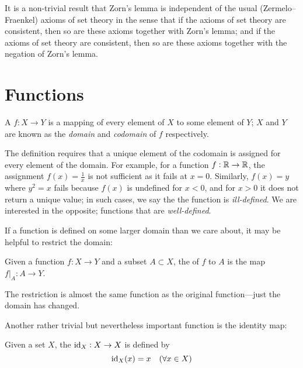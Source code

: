 \begin{remark}
It is a non-trivial result that Zorn's lemma is independent of the usual (Zermelo--Fraenkel) axioms of set theory in the sense that if the axioms of set theory are consistent, then so are these axioms together with Zorn's lemma; and if the axioms of set theory are consistent, then so are these axioms together with the negation of Zorn's lemma.
\end{remark}
\pagebreak

\section{Functions}
\begin{definition}[Function]
A  $f:X\to Y$ is a mapping of every element of $X$ to some element of $Y$; $X$ and $Y$ are known as the \emph{domain} and \emph{codomain} of $f$ respectively.
\end{definition}

\begin{remark}
The definition requires that a unique element of the codomain is assigned for every element of the domain. For example, for a function $f:\mathbb R \to \mathbb R$, the assignment $f(x)=\frac{1}{x}$ is not sufficient as it fails at $x=0$. Similarly, $f(x)=y$ where $y^2=x$ fails because $f(x)$ is undefined for $x<0$, and for $x>0$ it does not return a unique value; in such cases, we say the the function is \emph{ill-defined}. We are interested in the opposite; functions that are \emph{well-defined}.
\end{remark}

If a function is defined on some larger domain than we care about, it may be helpful to restrict the domain:

\begin{definition}[Restriction]
Given a function $f:X \to Y$ and a subset $A \subset X$, the  of $f$ to $A$ is the map $f|_A:A \to Y$.
\end{definition}

\begin{remark}
The restriction is almost the same function as the original function---just the domain has changed.
\end{remark}

Another rather trivial but nevertheless important function is the identity map:

\begin{definition}
Given a set $X$, the  $\operatorname{id}_X:X \to X$ is defined by
\[\operatorname{id}_X(x)=x\quad(\forall x\in X)\]
\end{definition}

